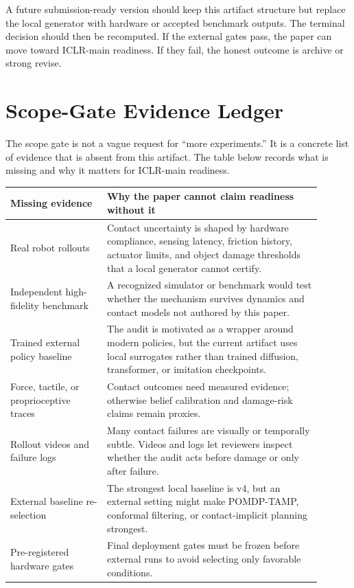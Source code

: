 \documentclass{article}
\begin{document}
A future submission-ready version should keep this artifact structure but replace the local generator with hardware or accepted benchmark outputs. The terminal decision should then be recomputed. If the external gates pass, the paper can move toward ICLR-main readiness. If they fail, the honest outcome is archive or strong revise.

\clearpage
\section{Scope-Gate Evidence Ledger}
The scope gate is not a vague request for ``more experiments.'' It is a concrete list of evidence that is absent from this artifact. The table below records what is missing and why it matters for ICLR-main readiness.

\begin{longtable}{p{0.28\linewidth}p{0.62\linewidth}}
\toprule
Missing evidence & Why the paper cannot claim readiness without it \\
\midrule
Real robot rollouts & Contact uncertainty is shaped by hardware compliance, sensing latency, friction history, actuator limits, and object damage thresholds that a local generator cannot certify. \\
Independent high-fidelity benchmark & A recognized simulator or benchmark would test whether the mechanism survives dynamics and contact models not authored by this paper. \\
Trained external policy baseline & The audit is motivated as a wrapper around modern policies, but the current artifact uses local surrogates rather than trained diffusion, transformer, or imitation checkpoints. \\
Force, tactile, or proprioceptive traces & Contact outcomes need measured evidence; otherwise belief calibration and damage-risk claims remain proxies. \\
Rollout videos and failure logs & Many contact failures are visually or temporally subtle. Videos and logs let reviewers inspect whether the audit acts before damage or only after failure. \\
External baseline re-selection & The strongest local baseline is v4, but an external setting might make POMDP-TAMP, conformal filtering, or contact-implicit planning strongest. \\
Pre-registered hardware gates & Final deployment gates must be frozen before external runs to avoid selecting only favorable conditions. \\
\bottomrule
\end{longtable}
\end{document}
